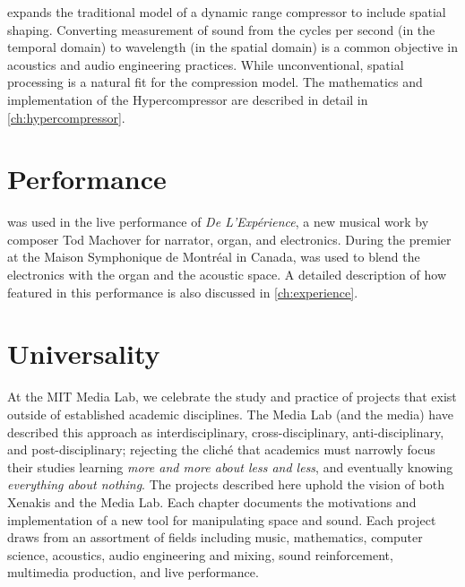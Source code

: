 \thesis expands the traditional model of a dynamic range compressor to
include spatial shaping.  Converting measurement of sound from the
cycles per second (in the temporal domain) to wavelength (in the
spatial domain) is a common objective in acoustics and audio
engineering practices.\cite{Davis1989} While unconventional, spatial
processing is a natural fit for the compression model. The mathematics
and implementation of the Hypercompressor are described in detail in
\autoref{ch:hypercompressor}.

\section{Performance}
\thesis was used in the live performance of \textit{De
  L'Exp\'{e}rience}, a new musical work by composer Tod Machover for
narrator, organ, and electronics. During the premier at the Maison
Symphonique de Montr\'{e}al in Canada, \thesis was used to blend the
electronics with the organ and the acoustic space.  A detailed
description of how \thesis featured in this performance is also
discussed in \autoref{ch:experience}.


\section{Universality}
\label{sec:universality}
At the MIT Media Lab, we celebrate the study and practice of projects
that exist outside of established academic disciplines. The Media Lab
(and the media) have described this approach as interdisciplinary,
cross-disciplinary, anti-disciplinary, and post-disciplinary; rejecting
the clich\'{e} that academics must narrowly focus their studies
learning \textit{more and more about less and less}, and eventually
knowing \textit{everything about nothing}.  The projects described
here uphold the vision of both Xenakis and the Media Lab. Each chapter
documents the motivations and implementation of a new tool for
manipulating space and sound. Each project draws from an assortment of
fields including music, mathematics, computer science, acoustics,
audio engineering and mixing, sound reinforcement, multimedia
production, and live performance. 


